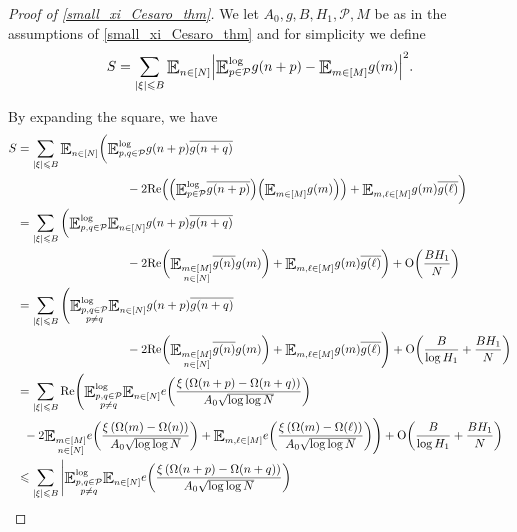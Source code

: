 \documentclass[letter,11pt]{article}
\theoremstyle{plain} %
\theoremstyle{definition} %
\theoremstyle{plain}
\theoremstyle{plain}
\theoremstyle{plain}
\numberwithin{equation}{section}
\newcommand{\Oh}{{\mathrm O}}
\renewcommand{\leq}{\leqslant}
\renewcommand{\Re}{\mathrm{Re}}
\newcommand{\E}{\raisebox{-0.4ex}{\scalebox{1.4}[1.3]{$\mathbb{E}$}}}
\newcommand{\Esub}[1]{\raisebox{-0.4ex}{\scalebox{1.4}[1.3]{$\mathbb{E}$}}\raisebox{-0.35ex}{\ensuremath{_{\scriptstyle #1}}}}
\newcommand{\logE}{{\E}^{\log}}
\newcommand{\1}{\mathbbm{1}}
\newcommand{\Pc}{\mathcal{P}}
\begin{document}
\begin{proof}[Proof of \cref{small_xi_Cesaro_thm}]
We let $A_0,g,B,H_1,\Pc,M$ be as in the assumptions of \cref{small_xi_Cesaro_thm} and for simplicity we define 
$$S = \sum_{|\xi|\leq B} \Esub{n\in[N]}\Big|\logE_{p\in\Pc}g(n+p)-\Esub{m\in[M]}g(m)\Big|^2.$$

By expanding the square, we have
\begin{align*}
S & = \sum_{|\xi|\leq B}\Esub{n\in[N]}\bigg(\logE_{p,q\in\Pc}g(n+p)\overline{g(n+q)} 
\\
& \hspace*{3.2cm} - 2\Re\Big(\Big(\logE_{p\in\Pc}\overline{g(n+p)}\Big)\Big(\Esub{m\in[M]}g(m)\Big)\Big) + \Esub{m,\ell\in[M]}g(m)\overline{g(\ell)}\bigg) 
\\
& = \sum_{|\xi|\leq B}\bigg(
\logE_{p,q\in\Pc} \Esub{n\in[N]}g(n+p)\overline{g(n+q)} 
\\
& \hspace*{3.2cm} - 2\Re\bigg(\Esub{\substack{m\in[M] \\ n\in[N]}}\overline{g(n)}g(m)\bigg) + \Esub{m,\ell\in[M]}g(m)\overline{g(\ell)}\bigg) 
+ \Oh\bigg(\frac{BH_1}{N}\bigg) 
\\
& = \sum_{|\xi|\leq B}\Bigg(
\logE_{\substack{p,q\in\Pc \\ p\neq q}} \Esub{n\in[N]}g(n+p)\overline{g(n+q)}
\\
& \hspace*{3.2cm} - 2\Re\bigg(\Esub{\substack{m\in[M] \\ n\in[N]}}\overline{g(n)}g(m)\bigg) + \Esub{m,\ell\in[M]}g(m)\overline{g(\ell)}\Bigg) 
+ \Oh\bigg(\frac{B}{\log H_1}+\frac{BH_1}{N}\bigg) 
\\
& = \sum_{|\xi|\leq B}\Re\Bigg(
\logE_{\substack{p,q\in\Pc \\ p\neq q}} \Esub{n\in[N]}e\bigg(\frac{\xi \left(\Omega(n+p)-\Omega(n+q)\right)}{A_0\sqrt{\log\log{N}}}\bigg) 
\\
& \hspace*{0.2cm} - 2\Esub{\substack{m\in[M] \\ n\in[N]}}e\bigg(\frac{\xi\left(\Omega(m)-\Omega(n)\right)}{A_0\sqrt{\log\log{N}}}\bigg) + \Esub{m,\ell\in[M]} e\bigg(\frac{\xi \left(\Omega(m)-\Omega(\ell)\right)}{A_0 \sqrt{\log\log{N}}}\bigg)\Bigg) + \Oh\bigg(\frac{B}{\log H_1}+\frac{BH_1}{N}\bigg) \\
& \leq \sum_{|\xi|\leq B}\Bigg|
\logE_{\substack{p,q\in\Pc \\ p\neq q}} \Esub{n\in[N]}e\bigg(\frac{\xi \left(\Omega(n+p)-\Omega(n+q)\right)}{A_0\sqrt{\log\log{N}}}\bigg) 

\end{align*}
\end{proof}
\end{document}
